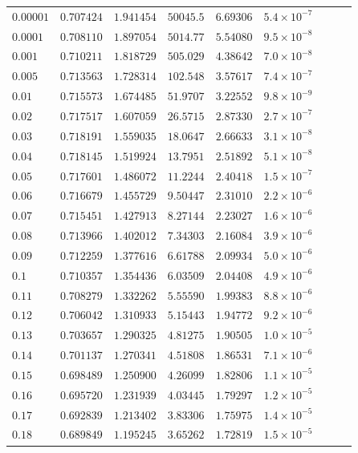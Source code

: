 \documentclass[12pt]{extarticle}
\theoremstyle{plain}
\theoremstyle{remark}
\begin{document}
\begin{longtable}{lcccccccc}
$0.00001$ & $0.707424$ & $1.941454$ & $50045.5$ & $6.69306$ & $5.4\times10^{-7}$ \\
$0.0001$ & $0.708110$ & $1.897054$ & $5014.77$ & $5.54080$ & $9.5\times10^{-8}$ \\
$0.001$ & $0.710211$ & $1.818729$ & $505.029$ & $4.38642$ & $7.0\times10^{-8}$ \\
$0.005$ & $0.713563$ & $1.728314$ & $102.548$ & $3.57617$ & $7.4\times10^{-7}$ \\
$0.01$ & $0.715573$ & $1.674485$ & $51.9707$ & $3.22552$ & $9.8\times10^{-9}$ \\
$0.02$ & $0.717517$ & $1.607059$ & $26.5715$ & $2.87330$ & $2.7\times10^{-7}$ \\
$0.03$ & $0.718191$ & $1.559035$ & $18.0647$ & $2.66633$ & $3.1\times10^{-8}$ \\
$0.04$ & $0.718145$ & $1.519924$ & $13.7951$ & $2.51892$ & $5.1\times10^{-8}$ \\
$0.05$ & $0.717601$ & $1.486072$ & $11.2244$ & $2.40418$ & $1.5\times10^{-7}$ \\
$0.06$ & $0.716679$ & $1.455729$ & $9.50447$ & $2.31010$ & $2.2\times10^{-6}$ \\
$0.07$ & $0.715451$ & $1.427913$ & $8.27144$ & $2.23027$ & $1.6\times10^{-6}$ \\
$0.08$ & $0.713966$ & $1.402012$ & $7.34303$ & $2.16084$ & $3.9\times10^{-6}$ \\
$0.09$ & $0.712259$ & $1.377616$ & $6.61788$ & $2.09934$ & $5.0\times10^{-6}$ \\
$0.1$ & $0.710357$ & $1.354436$ & $6.03509$ & $2.04408$ & $4.9\times10^{-6}$ \\
$0.11$ & $0.708279$ & $1.332262$ & $5.55590$ & $1.99383$ & $8.8\times10^{-6}$ \\
$0.12$ & $0.706042$ & $1.310933$ & $5.15443$ & $1.94772$ & $9.2\times10^{-6}$ \\
$0.13$ & $0.703657$ & $1.290325$ & $4.81275$ & $1.90505$ & $1.0\times10^{-5}$ \\
$0.14$ & $0.701137$ & $1.270341$ & $4.51808$ & $1.86531$ & $7.1\times10^{-6}$ \\
$0.15$ & $0.698489$ & $1.250900$ & $4.26099$ & $1.82806$ & $1.1\times10^{-5}$ \\
$0.16$ & $0.695720$ & $1.231939$ & $4.03445$ & $1.79297$ & $1.2\times10^{-5}$ \\
$0.17$ & $0.692839$ & $1.213402$ & $3.83306$ & $1.75975$ & $1.4\times10^{-5}$ \\
$0.18$ & $0.689849$ & $1.195245$ & $3.65262$ & $1.72819$ & $1.5\times10^{-5}$ \\

\end{longtable}
\end{document}
